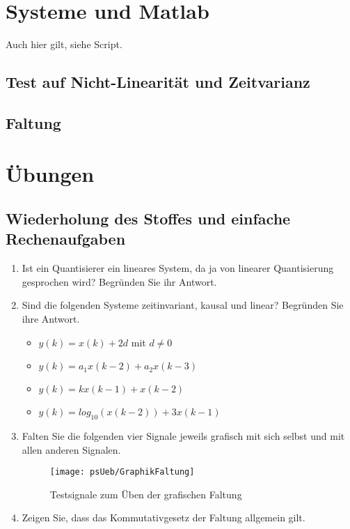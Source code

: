 
{
\section{Systeme und Matlab}
Auch hier gilt, siehe Script.
\subsection{Test auf Nicht-Linearität und Zeitvarianz}
\subsection{Faltung}
}

\section{Übungen}
\subsection{Wiederholung des Stoffes und einfache Rechenaufgaben}
\begin{enumerate}
    \item Ist ein Quantisierer ein lineares System, da ja von
    linearer Quantisierung gesprochen wird? Begründen Sie ihr
    Antwort.
    \item Sind die folgenden Systeme zeitinvariant, kausal und linear? Begründen Sie ihre Antwort.
    \begin{itemize}
        \item{$y(k) = x(k) + 2d $ mit $d\neq 0$}
        \item $y(k) = a_1 x(k-2) + a_2 x(k-3)$
        \item $y(k) = k x(k-1) + x(k-2)$
        \item $y(k) = log_{10}( x(k-2)) + 3 x(k-1) $
    \end{itemize}
    \item Falten Sie die folgenden vier Signale jeweils grafisch mit sich selbst und mit allen anderen
    Signalen.
    \begin{figure}[H]
    \begin{center}
    \texttt{[image: psUeb/GraphikFaltung]}
    \caption{\label{pic:UebungGraphischeFaltung}Testsignale zum Üben der grafischen Faltung}
    \end{center}
    \end{figure}
    \item Zeigen Sie, dass das Kommutativgesetz der Faltung allgemein gilt.
\end{enumerate}
